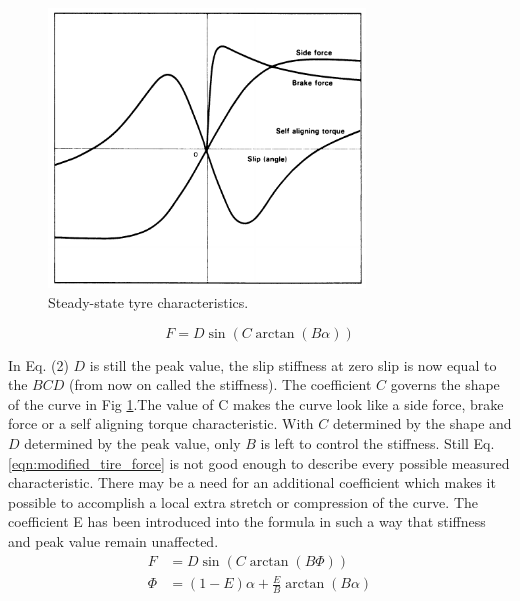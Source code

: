 \documentclass[12pt]{article}
\begin{document}
\begin{figure}[t]
	\centering
	\includegraphics[width=0.75\textwidth,keepaspectratio]{images/Steady-State-Tyre-Characteristics.pdf}
	\caption{Steady-state tyre characteristics.}
	\label{fig_02:steady_state_tyre_characteristics}
\end{figure}
\begin{equation}
\label{eqn:modified_tire_force}
F = D\sin(C\arctan(B\alpha))
\end{equation}
\par In Eq. (2) $D$ is still the peak value, the slip
stiffness at zero slip is now equal to the
$BCD$ (from now on called the stiffness). The
coefficient $C$ governs the shape of the curve in Fig \ref{fig_02:steady_state_tyre_characteristics}.The value of C makes the curve look
like a side force, brake force or a self aligning torque characteristic. With $C$ determined
 by the shape and $D$ determined by the peak value,
only $B$ is left to control the stiffness. Still Eq. \ref{eqn:modified_tire_force} is not good enough to describe
 every possible measured characteristic. There may
 be a need for an additional coefficient which
 makes it possible to accomplish a local extra
 stretch or compression of the curve. The coefficient
 E has been introduced into the formula in such a
way that stiffness and peak value remain
unaffected.
\begin{subequations} 
	\label{eqn:modified_tire_with_force_side_force_char}
	\begin{align} 
	F &= D\sin(C\arctan(B\Phi)) \\
	\Phi &= (1-E)\alpha + \frac{E}{B}\arctan(B\alpha)
	\end{align} 
\end{subequations}
\end{document}

